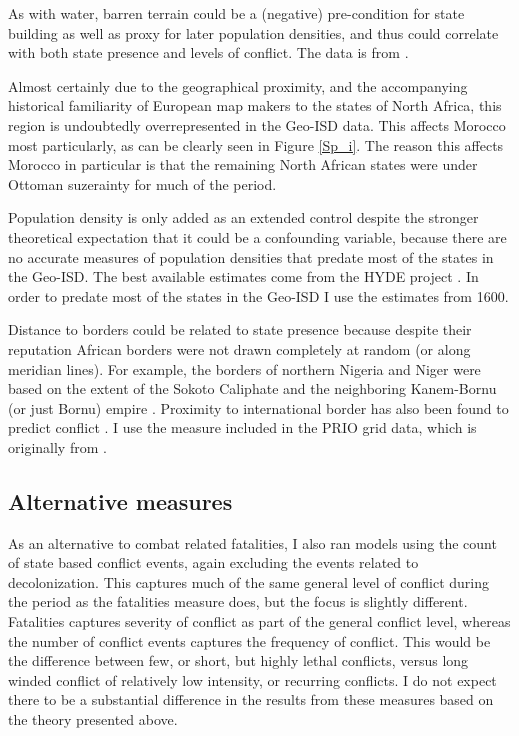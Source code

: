 \documentclass[12pt]{article}
\begin{document}
As with water, barren terrain could be a (negative) pre-condition for state
building as well as proxy for later population densities, and thus could
correlate with both state presence and levels of conflict. The data is from
\citet{Bontemps2009}.

Almost certainly due to the geographical proximity, and the accompanying
historical familiarity of European map makers to the states of North Africa,
this region is undoubtedly overrepresented in the Geo-ISD data. This affects
Morocco most particularly, as can be clearly seen in Figure \ref{Sp_i}. The
reason this affects Morocco in particular is that the remaining North African
states were under Ottoman suzerainty for much of the period.

Population density is only added as an extended control despite the stronger
theoretical expectation that it could be a confounding variable, because there
are no accurate measures of population densities that predate most of the
states in the Geo-ISD. The best available estimates come from the HYDE project
\citep{Goldewijk2016}. In order to predate most of the states in the Geo-ISD I
use the estimates from 1600.


Distance to borders could be related to state presence because despite their
reputation African borders were not drawn completely at random (or along
meridian lines). For example, the borders of northern Nigeria and Niger were
based on the extent of the Sokoto Caliphate and the neighboring Kanem-Bornu (or
just Bornu) empire \citep{HiribarrenVincent2017AHoB}. Proximity to international
border has also been found to predict conflict \citep{Buhaug2002}. I use the
measure included in the PRIO grid data, which is originally from
\citet{Weidmann2010a}.

\subsection{Alternative measures}

As an alternative to combat related fatalities, I also ran models using the
count of state based conflict events, again excluding the events related to
decolonization. This captures much of the same general level of conflict during
the period as the fatalities measure does, but the focus is slightly different.
Fatalities captures severity of conflict as part of the general conflict level,
whereas the number of conflict events captures the frequency of conflict. This
would be the difference between few, or short, but highly lethal conflicts,
versus long winded conflict of relatively low intensity, or recurring conflicts.
I do not expect there to be a substantial difference in the results from these
measures based on the theory presented above.
\end{document}
